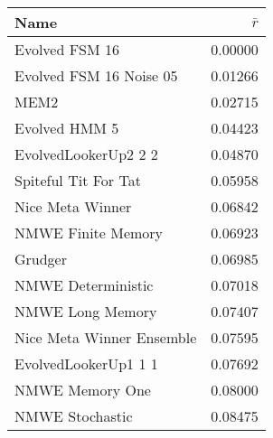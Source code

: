 \begin{tabular}{lr}
\toprule
Name                      &   $\bar{r}$ \\
\midrule
Evolved FSM 16            &    0.00000 \\
Evolved FSM 16 Noise 05   &    0.01266 \\
MEM2                      &    0.02715 \\
Evolved HMM 5             &    0.04423 \\
EvolvedLookerUp2 2 2      &    0.04870 \\
Spiteful Tit For Tat      &    0.05958 \\
Nice Meta Winner          &    0.06842 \\
NMWE Finite Memory        &    0.06923 \\
Grudger                   &    0.06985 \\
NMWE Deterministic        &    0.07018 \\
NMWE Long Memory          &    0.07407 \\
Nice Meta Winner Ensemble &    0.07595 \\
EvolvedLookerUp1 1 1      &    0.07692 \\
NMWE Memory One           &    0.08000 \\
NMWE Stochastic           &    0.08475 \\
\bottomrule
\end{tabular}
